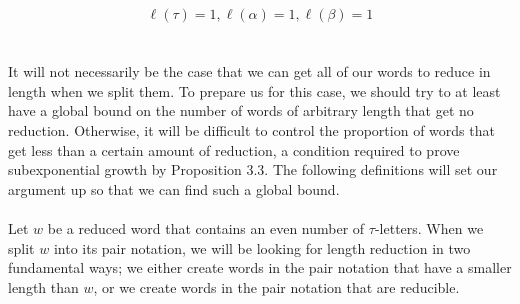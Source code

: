 \documentclass[11pt]{amsart}
\theoremstyle{definition}
\theoremstyle{remark}
\numberwithin{equation}{section}
\begin{document}
$$\ell(\tau) = 1, \ell(\alpha) = 1, \ell(\beta) = 1 $$ \\ \\
It will not necessarily be the case that we can get all of our words to reduce in length when we split them. To prepare us for this case, we should try to at least have a global bound on the number of words of arbitrary length that get no reduction. Otherwise, it will be difficult to control the proportion of words that get less than a certain amount of reduction, a condition required to prove subexponential growth by Proposition 3.3. The following definitions will set our argument up so that we can find such a global bound. \\ \\
Let $w$ be a reduced word that contains an even number of $\tau$-letters. When we split $w$ into its pair notation, we will be looking for length reduction in two fundamental ways; we either create words in the pair notation that have a smaller length than $w$, or we create words in the pair notation that are reducible. \\  
\end{document}

